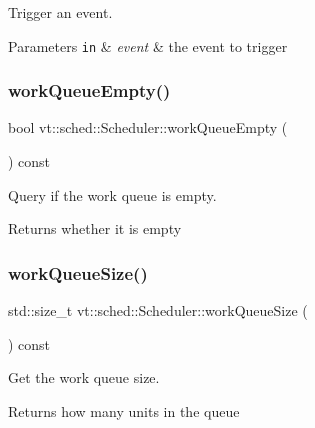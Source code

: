Trigger an event. 


\begin{DoxyParams}[1]{Parameters}
\mbox{\tt in}  & {\em event} & the event to trigger \\
\hline
\end{DoxyParams}
\mbox{\label{structvt_1_1sched_1_1_scheduler_a49bfd7d4a6d187c6c995b84885a1ed19}} 
\subsubsection{\texorpdfstring{work\+Queue\+Empty()}{workQueueEmpty()}}
{\footnotesize\ttfamily bool vt\+::sched\+::\+Scheduler\+::work\+Queue\+Empty (\begin{DoxyParamCaption}{ }\end{DoxyParamCaption}) const\hspace{0.3cm}{\ttfamily [inline]}}



Query if the work queue is empty. 

\begin{DoxyReturn}{Returns}
whether it is empty 
\end{DoxyReturn}
\mbox{\label{structvt_1_1sched_1_1_scheduler_a6ee315ffd90f37a277bb2b5622af1f4f}} 
\subsubsection{\texorpdfstring{work\+Queue\+Size()}{workQueueSize()}}
{\footnotesize\ttfamily std\+::size\+\_\+t vt\+::sched\+::\+Scheduler\+::work\+Queue\+Size (\begin{DoxyParamCaption}{ }\end{DoxyParamCaption}) const\hspace{0.3cm}{\ttfamily [inline]}}



Get the work queue size. 

\begin{DoxyReturn}{Returns}
how many units in the queue 
\end{DoxyReturn}


